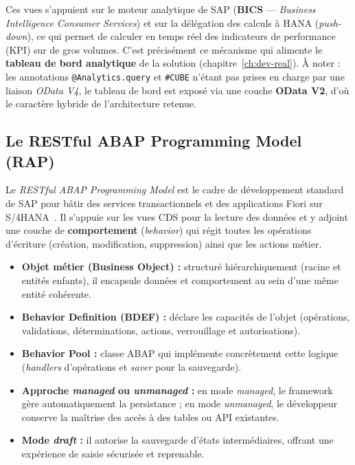 \documentclass[12pt,a4paper,oneside]{report}
\begin{document}
Ces vues s'appuient sur le moteur analytique de SAP (\textbf{BICS} --- \textit{Business
Intelligence Consumer Services}) et sur la délégation des calculs à HANA
(\textit{push-down}), ce qui permet de calculer en temps réel des indicateurs de
performance (KPI) sur de gros volumes. C'est précisément ce mécanisme qui alimente le
\textbf{tableau de bord analytique} de la solution (chapitre~\ref{ch:dev-real}). À noter :
les annotations \texttt{@Analytics.query} et \texttt{\#CUBE} n'étant pas prises en charge
par une liaison \textit{OData V4}, le tableau de bord est exposé via une couche
\textbf{OData V2}, d'où le caractère hybride de l'architecture retenue.

\subsection{Le RESTful ABAP Programming Model (RAP)}\label{ch2:rap}

Le \textit{RESTful ABAP Programming Model} est le cadre de développement standard de SAP
pour bâtir des services transactionnels et des applications Fiori sur S/4HANA~\cite{sap-rap}. Il
s'appuie sur les vues CDS pour la lecture des données et y adjoint une couche de
\textbf{comportement} (\textit{behavior}) qui régit toutes les opérations d'écriture
(création, modification, suppression) ainsi que les actions métier.

\begin{itemize}[label=---, itemsep=0.2em]
	\item \textbf{Objet métier (Business Object) :} structuré hiérarchiquement (racine et
	entités enfants), il encapsule données et comportement au sein d'une même entité
	cohérente.
	\item \textbf{Behavior Definition (BDEF) :} déclare les capacités de l'objet
	(opérations, validations, déterminations, actions, verrouillage et autorisations).
	\item \textbf{Behavior Pool :} classe ABAP qui implémente concrètement cette logique
	(\textit{handlers} d'opérations et \textit{saver} pour la sauvegarde).
	\item \textbf{Approche \textit{managed} ou \textit{unmanaged} :} en mode
	\textit{managed}, le framework gère automatiquement la persistance ; en mode
	\textit{unmanaged}, le développeur conserve la maîtrise des accès à des tables ou API
	existantes.
	\item \textbf{Mode \textit{draft} :} il autorise la sauvegarde d'états intermédiaires,
	offrant une expérience de saisie sécurisée et reprenable.
\end{itemize}
\end{document}

